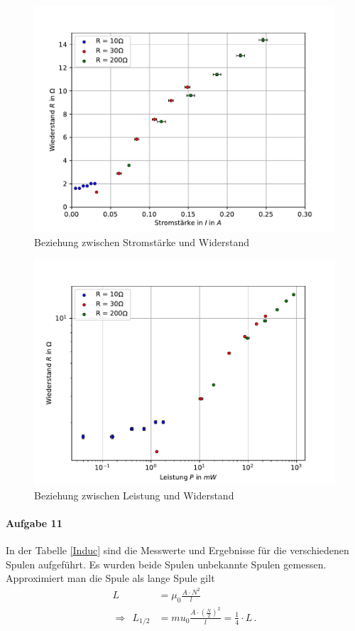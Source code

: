 \documentclass[11pt, a4paper]{article}
\begin{document}
    \begin{figure}
        \centering
        \includegraphics[width=\textwidth]{amp.pdf}
        \caption{Beziehung zwischen Stromstärke und Widerstand}
        \label{amp}
    \end{figure}
    \begin{figure}
        \centering
        \includegraphics[width=\textwidth]{pow.pdf}
        \caption{Beziehung zwischen Leistung und Widerstand}
        \label{pow}
    \end{figure}

    \paragraph{Aufgabe 11}
    In der Tabelle \ref{Induc} sind die Messwerte und Ergebnisse für die verschiedenen Spulen aufgeführt. Es wurden beide Spulen unbekannte Spulen gemessen. Approximiert man die Spule als lange Spule gilt
    \begin{align}
        L &= \mu_0 \frac{A\cdot N^2}{l} \\
        \Rightarrow \ \ L_{1/2} &= mu_0 \frac{A\cdot \left(\frac{N}{2}\right)^2}{l} = \frac{1}{4} \cdot L \,.
    \end{align}
\end{document}
